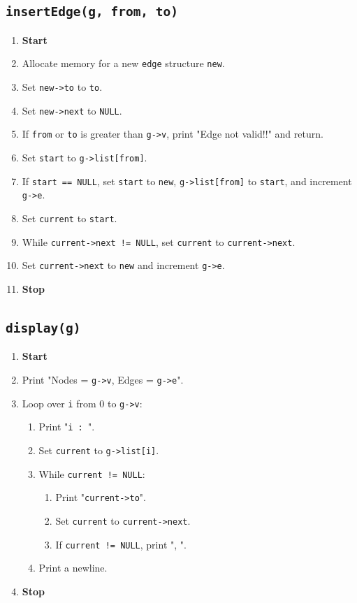 {  \subsection{\texttt{insertEdge(g, from, to)}}
  \begin{enumerate}[label=\arabic*:,left=0pt]
    \item \textbf{Start}
    \item Allocate memory for a new \texttt{edge} structure \texttt{new}.
    \item Set \texttt{new->to} to \texttt{to}.
    \item Set \texttt{new->next} to \texttt{NULL}.
    \item If \texttt{from} or \texttt{to} is greater than \texttt{g->v}, print "Edge not valid!!" and return.
    \item Set \texttt{start} to \texttt{g->list[from]}.
    \item If \texttt{start == NULL}, set \texttt{start} to \texttt{new}, \texttt{g->list[from]} to \texttt{start}, and increment \texttt{g->e}.
    \item Set \texttt{current} to \texttt{start}.
    \item While \texttt{current->next != NULL}, set \texttt{current} to \texttt{current->next}.
    \item Set \texttt{current->next} to \texttt{new} and increment \texttt{g->e}.
    \item \textbf{Stop}
  \end{enumerate}

  \subsection{\texttt{display(g)}}
  \begin{enumerate}[label=\arabic*:,left=0pt]
    \item \textbf{Start}
    \item Print "Nodes = \texttt{g->v}, Edges = \texttt{g->e}".
    \item Loop over \texttt{i} from 0 to \texttt{g->v}:
          \begin{enumerate}[label=2.\arabic*:, start=1]
            \item Print "\texttt{i : }".
            \item Set \texttt{current} to \texttt{g->list[i]}.
            \item While \texttt{current != NULL}:
                  \begin{enumerate}[label=2.2.\arabic*:, start=1]
                    \item Print "\texttt{current->to}".
                    \item Set \texttt{current} to \texttt{current->next}.
                    \item If \texttt{current != NULL}, print ", ".
                  \end{enumerate}
            \item Print a newline.
          \end{enumerate}
    \item \textbf{Stop}
  \end{enumerate}

}
